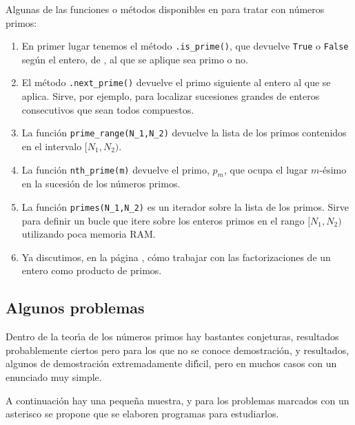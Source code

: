 Algunas de las funciones o m\'etodos disponibles en {\sage} para tratar con
n\'umeros primos: 
\begin{enumerate}
 \item En primer lugar tenemos el m\'etodo \lstinline|.is_prime()|, que devuelve
\lstinline|True| o \lstinline|False| 
seg\'un el entero, de {\sage},  al que se aplique sea primo o no. 
\item El m\'etodo \lstinline|.next_prime()| devuelve el primo siguiente al
entero al que se aplica. Sirve, por ejemplo, para localizar sucesiones grandes
de enteros consecutivos que sean todos compuestos.
\item La funci\'on \lstinline|prime_range(N_1,N_2)| devuelve la lista de los
primos contenidos en el intervalo $[N_1,N_2)$.
 
 \item La funci\'on \lstinline|nth_prime(m)| devuelve el primo, $p_m$,  
que ocupa el lugar $m$-\'esimo en la sucesi\'on de los n\'umeros primos.
 
 \item La funci\'on \lstinline|primes(N_1,N_2)| es un iterador sobre la lista de
los primos. Sirve para definir un bucle que itere sobre los enteros primos en el
rango $[N_1,N_2)$  utilizando poca memoria RAM.
\item Ya discutimos, en la p\'agina \pageref{factoriz}, c\'omo trabajar con las
factorizaciones de un entero como producto de primos.
 
 
\end{enumerate}





\subsection{Algunos problemas}
Dentro de la teor\'{\i}a de los n\'umeros primos hay bastantes conjeturas,
resultados probablemente ciertos pero para los que no se conoce demostraci\'on,
y resultados, algunos de demostraci\'on extremadamente dif\'{\i}cil, pero en
muchos casos con un enunciado muy simple. 


\bigskip


A continuaci\'on hay una peque\~na muestra, y para los problemas
marcados con un asterisco {\sc se propone que se elaboren programas} para
estudiarlos. 




